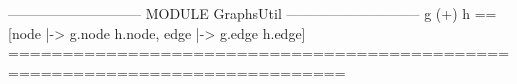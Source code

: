 \documentclass{article}
\begin{document}
\begin{tla}
----------------------------- MODULE GraphsUtil -----------------------------
g (+) h == [node |-> g.node \cup h.node, edge |-> g.edge \cup h.edge]
=============================================================================
\end{tla}
\end{document}
